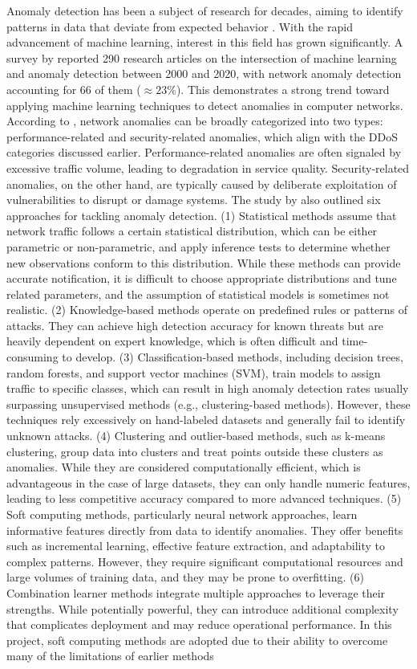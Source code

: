 Anomaly detection has been a subject of research for decades, aiming to identify patterns in data that deviate from expected behavior \citep{9439459}. With the rapid advancement of machine learning, interest in this field has grown significantly. A survey by \cite{9439459} reported 290 research articles on the intersection of machine learning and anomaly detection between 2000 and 2020, with network anomaly detection accounting for 66 of them ($\approx23\%$). This demonstrates a strong trend toward applying machine learning techniques to detect anomalies in computer networks. According to \cite{6524462}, network anomalies can be broadly categorized into two types: performance-related and security-related anomalies, which align with the DDoS categories discussed earlier. Performance-related anomalies are often signaled by excessive traffic volume, leading to degradation in service quality. Security-related anomalies, on the other hand, are typically caused by deliberate exploitation of vulnerabilities to disrupt or damage systems. The study by \cite{6524462} also outlined six approaches for tackling anomaly detection. (1) Statistical methods assume that network traffic follows a certain statistical distribution, which can be either parametric or non-parametric, and apply inference tests to determine whether new observations conform to this distribution. While these methods can provide accurate notification, it is difficult to choose appropriate distributions and tune related parameters, and the assumption of statistical models is sometimes not realistic. (2) Knowledge-based methods operate on predefined rules or patterns of attacks. They can achieve high detection accuracy for known threats but are heavily dependent on expert knowledge, which is often difficult and time-consuming to develop. (3) Classification-based methods, including decision trees, random forests, and support vector machines (SVM), train models to assign traffic to specific classes, which can result in high anomaly detection rates usually surpassing unsupervised methods (e.g., clustering-based methods). However, these techniques rely excessively on hand-labeled datasets and generally fail to identify unknown attacks. (4) Clustering and outlier-based methods, such as k-means clustering, group data into clusters and treat points outside these clusters as anomalies. While they are considered computationally efficient, which is advantageous in the case of large datasets, they can only handle numeric features, leading to less competitive accuracy compared to more advanced techniques. (5) Soft computing methods, particularly neural network approaches, learn informative features directly from data to identify anomalies. They offer benefits such as incremental learning, effective feature extraction, and adaptability to complex patterns. However, they require significant computational resources and large volumes of training data, and they may be prone to overfitting. (6) Combination learner methods integrate multiple approaches to leverage their strengths. While potentially powerful, they can introduce additional complexity that complicates deployment and may reduce operational performance. In this project, soft computing methods are adopted due to their ability to overcome many of the limitations of earlier methods 